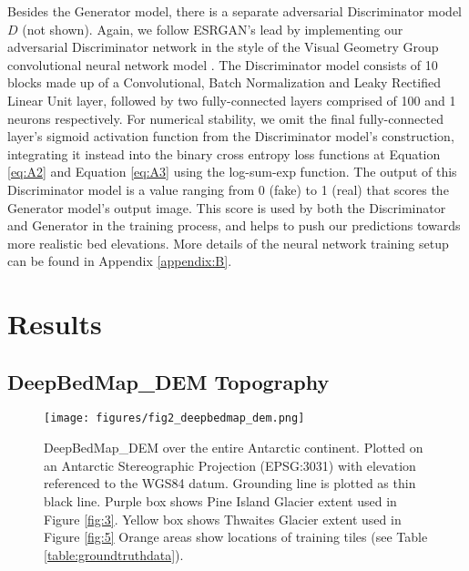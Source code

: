 \documentclass[tc, manuscript]{copernicus}
\begin{document}
Besides the Generator model, there is a separate adversarial Discriminator model $D$ (not shown).
Again, we follow ESRGAN's \citep{WangESRGANEnhancedSuperResolution2018} lead by implementing our adversarial Discriminator network in the style of the Visual Geometry Group convolutional neural network model \citep[VGG,][]{SimonyanVeryDeepConvolutional2014}.
The Discriminator model consists of 10 blocks made up of a Convolutional, Batch Normalization \citep{IoffeBatchNormalizationAccelerating2015} and Leaky Rectified Linear Unit \citep{MaasRectifiernonlinearitiesimprove2013} layer, followed by two fully-connected layers comprised of 100 and 1 neurons respectively.
For numerical stability, we omit the final fully-connected layer's sigmoid activation function from the Discriminator model's construction, integrating it instead into the binary cross entropy loss functions at Equation \eqref{eq:A2} and Equation \eqref{eq:A3} using the log-sum-exp function.
The output of this Discriminator model is a value ranging from 0 (fake) to 1 (real) that scores the Generator model's output image.
This score is used by both the Discriminator and Generator in the training process, and helps to push our predictions towards more realistic bed elevations.
More details of the neural network training setup can be found in Appendix \ref{appendix:B}.


\section{Results}

\subsection{DeepBedMap\_DEM Topography} \label{section:deepbedmapdemtopography}

\begin{figure*}[htbp]
    \centering
    \texttt{[image: figures/fig2\_deepbedmap\_dem.png]}
    \caption{
      DeepBedMap\_DEM over the entire Antarctic continent.
      Plotted on an Antarctic Stereographic Projection (EPSG:3031) with elevation referenced to the WGS84 datum.
      Grounding line is plotted as thin black line.
      Purple box shows Pine Island Glacier extent used in Figure \ref{fig:3}.
      Yellow box shows Thwaites Glacier extent used in Figure \ref{fig:5}
      Orange areas show locations of training tiles (see Table \ref{table:groundtruthdata}).
    }
    \label{fig:2}
\end{figure*}
\end{document}
